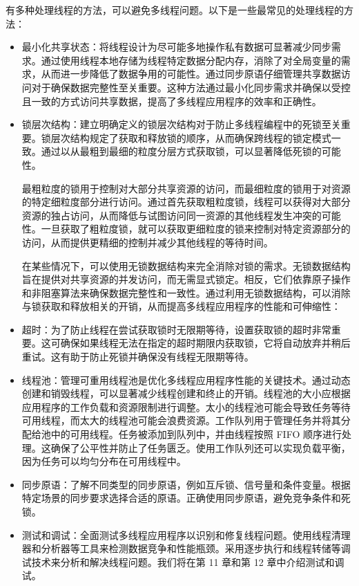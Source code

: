
有多种处理线程的方法，可以避免多线程问题。以下是一些最常见的处理线程的方法：

\begin{itemize}
\item
最小化共享状态：将线程设计为尽可能多地操作私有数据可显著减少同步需求。通过使用线程本地存储为线程特定数据分配内存，消除了对全局变量的需求，从而进一步降低了数据争用的可能性。通过同步原语仔细管理共享数据访问对于确保数据完整性至关重要。这种方法通过最小化同步需求并确保以受控且一致的方式访问共享数据，提高了多线程应用程序的效率和正确性。

\item
锁层次结构：建立明确定义的锁层次结构对于防止多线程编程中的死锁至关重要。锁层次结构规定了获取和释放锁的顺序，从而确保跨线程的锁定模式一致。通过以从最粗到最细的粒度分层方式获取锁，可以显著降低死锁的可能性。

最粗粒度的锁用于控制对大部分共享资源的访问，而最细粒度的锁用于对资源的特定细粒度部分进行访问。通过首先获取粗粒度锁，线程可以获得对大部分资源的独占访问，从而降低与试图访问同一资源的其他线程发生冲突的可能性。一旦获取了粗粒度锁，就可以获取更细粒度的锁来控制对特定资源部分的访问，从而提供更精细的控制并减少其他线程的等待时间。

在某些情况下，可以使用无锁数据结构来完全消除对锁的需求。无锁数据结构旨在提供对共享资源的并发访问，而无需显式锁定。相反，它们依靠原子操作和非阻塞算法来确保数据完整性和一致性。通过利用无锁数据结构，可以消除与锁获取和释放相关的开销，从而提高多线程应用程序的性能和可伸缩性：

\item
超时：为了防止线程在尝试获取锁时无限期等待，设置获取锁的超时非常重要。这可确保如果线程无法在指定的超时期限内获取锁，它将自动放弃并稍后重试。这有助于防止死锁并确保没有线程无限期等待。

\item
线程池：管理可重用线程池是优化多线程应用程序性能的关键技术。通过动态创建和销毁线程，可以显著减少线程创建和终止的开销。线程池的大小应根据应用程序的工作负载和资源限制进行调整。太小的线程池可能会导致任务等待可用线程，而太大的线程池可能会浪费资源。工作队列用于管理任务并将其分配给池中的可用线程。任务被添加到队列中，并由线程按照 FIFO 顺序进行处理。这确保了公平性并防止了任务匮乏。使用工作队列还可以实现负载平衡，因为任务可以均匀分布在可用线程中。

\item
同步原语：了解不同类型的同步原语，例如互斥锁、信号量和条件变量。根据特定场景的同步要求选择合适的原语。正确使用同步原语，避免竞争条件和死锁。

\item
测试和调试：全面测试多线程应用程序以识别和修复线程问题。使用线程清理器和分析器等工具来检测数据竞争和性能瓶颈。采用逐步执行和线程转储等调试技术来分析和解决线程问题。我们将在第 11 章和第 12 章中介绍测试和调试。


\end{itemize}
